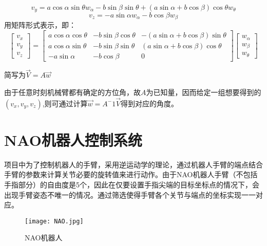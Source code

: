 \begin{enumerate}
\begin{displaymath}
\begin{array}{l}
\end{array}
\end{displaymath}
\begin{displaymath}
{v_y} = a\cos \alpha \sin \theta {w_\alpha } - b\sin \beta \sin \theta  + (a\sin \alpha  + b\cos \beta )\cos \theta {w_\theta }
\end{displaymath}
\begin{displaymath}
{v_z} =  - a\sin \alpha {w_\alpha } - b\cos \beta {w_\beta }
\end{displaymath}
用矩阵形式表示，即：
\begin{equation}
\left[ {\begin{array}{*{20}{c}}
	{{v_x}}\\
	{{v_y}}\\
	{{v_z}}
	\end{array}} \right] = \left[ {\begin{array}{*{20}{c}}
	{a\cos \alpha \cos \theta }&{ - b\sin \beta \cos \theta }&{ - (a\sin \alpha  + b\cos \beta )\sin \theta }\\
	{a\cos \alpha \sin \theta }&{ - b\sin \beta \sin \theta }&{(a\sin \alpha  + b\cos \beta )\cos \theta }\\
	{ - a\sin \alpha }&{ - b\cos \beta }&0
	\end{array}} \right]\left[ {\begin{array}{*{20}{c}}
	{{w_\alpha }}\\
	{{w_\beta }}\\
	{{w_\theta }}
	\end{array}} \right]
\end{equation}

简写为$\overrightarrow {V}  = {A}\overrightarrow w $

由于任意时刻机械臂都有确定的方位角，故$A$为已知量，因而给定一组想要得到的$(v_x,v_y,v_z)$,则可通过计算$\overrightarrow w=A^-1\overrightarrow {V}$得到对应的角度。
\end{enumerate}




\section{NAO机器人控制系统}
项目中为了控制机器人的手臂，采用逆运动学的理论，通过机器人手臂的端点结合手臂的参数来计算关节必要的旋转值来进行动作。由于NAO机器人手臂（不包括手指部分）的自由度是5个，因此在仅要设置手指尖端的目标坐标点的情况下，会出现手臂姿态不唯一的情况。通过筛选使得手臂各个关节与端点的坐标实现一一对应。

\begin{figure}[htbp]
\small
\centering
\texttt{[image: NAO.jpg]}
\caption{NAO机器人} 
\end{figure}

